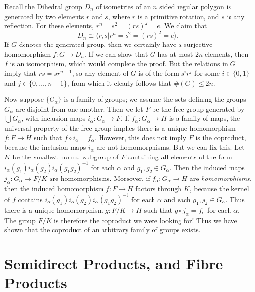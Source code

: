 \begin{example}
    Recall the Dihedral group $D_n$ of isometries of an $n$ sided regular polygon is generated by two elements $r$ and $s$, where $r$ is a primitive rotation, and $s$ is any reflection. For these elements, $r^n = s^2 = (rs)^2 = e$. We claim that
    \[ D_n \cong \langle r,s | r^n = s^2 = (rs)^2 = e \rangle. \]
    If $G$ denotes the generated group, then we certainly have a surjective homomorphism $f: G \to D_n$. If we can show that $G$ has at most $2n$ elements, then $f$ is an isomorphism, which would complete the proof. But the relations in $G$ imply that $rs = sr^{n-1}$, so any element of $G$ is of the form $s^i r^j$ for some $i \in \{ 0, 1 \}$ and $j \in \{ 0, \dots, n - 1 \}$, from which it clearly follows that $\#(G) \leq 2n$.
\end{example}

Now suppose $\{ G_\alpha \}$ is a family of groups; we assume the sets defining the groups $G_\alpha$ are disjoint from one another. Then we let $F$ be the free group generated by $\bigcup G_\alpha$, with inclusion maps $i_\alpha: G_\alpha \to F$. If $f_\alpha: G_\alpha \to H$ is a family of maps, the universal property of the free group implies there is a unique homomorphism $f: F \to H$ such that $f \circ i_\alpha = f_\alpha$. However, this does not imply $F$ is the coproduct, because the inclusion maps $i_\alpha$ are not homomorphisms. But we can fix this. Let $K$ be the smallest normal subgroup of $F$ containing all elements of the form $i_\alpha(g_1) i_\alpha(g_2) i_\alpha(g_1 g_2)^{-1}$ for each $\alpha$ and $g_1,g_2 \in G_\alpha$. Then the induced maps $j_\alpha: G_\alpha \to F/K$ are homomorphisms. Moreover, if $f_\alpha: G_\alpha \to H$ are \emph{homomorphisms}, then the induced homomorphism $f: F \to H$ factors through $K$, because the kernel of $f$ contains $i_\alpha(g_1) i_\alpha(g_2) i_\alpha(g_1 g_2)^{-1}$ for each $\alpha$ and each $g_1, g_2 \in G_\alpha$. Thus there is a unique homomorphism $g: F/K \to H$ such that $g \circ j_\alpha = f_\alpha$ for each $\alpha$. The group $F/K$ is therefore the coproduct we were looking for! Thus we have shown that the coproduct of an arbitrary family of groups exists.

\section{Semidirect Products, and Fibre Products}






